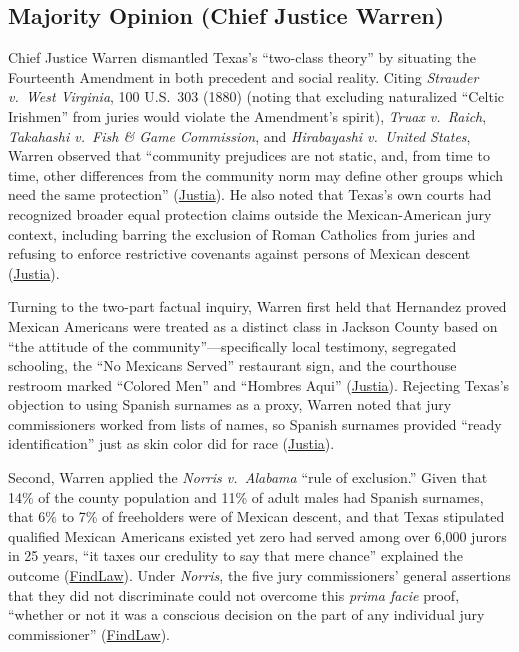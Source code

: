 \documentclass[12pt]{article}
\begin{document}
\subsection{Majority Opinion (Chief Justice Warren)}
Chief Justice Warren dismantled Texas's ``two-class theory'' by situating the Fourteenth Amendment in both precedent and social reality. Citing \textit{Strauder v.\ West Virginia}, 100 U.S.\ 303 (1880) (noting that excluding naturalized ``Celtic Irishmen'' from juries would violate the Amendment's spirit), \textit{Truax v.\ Raich}, \textit{Takahashi v.\ Fish \& Game Commission}, and \textit{Hirabayashi v.\ United States}, Warren observed that ``community prejudices are not static, and, from time to time, other differences from the community norm may define other groups which need the same protection'' (\href{https://supreme.justia.com/cases/federal/us/347/475/}{Justia}). He also noted that Texas's own courts had recognized broader equal protection claims outside the Mexican-American jury context, including barring the exclusion of Roman Catholics from juries and refusing to enforce restrictive covenants against persons of Mexican descent (\href{https://supreme.justia.com/cases/federal/us/347/475/}{Justia}).

Turning to the two-part factual inquiry, Warren first held that Hernandez proved Mexican Americans were treated as a distinct class in Jackson County based on ``the attitude of the community''---specifically local testimony, segregated schooling, the ``No Mexicans Served'' restaurant sign, and the courthouse restroom marked ``Colored Men'' and ``Hombres Aqui'' (\href{https://supreme.justia.com/cases/federal/us/347/475/}{Justia}). Rejecting Texas's objection to using Spanish surnames as a proxy, Warren noted that jury commissioners worked from lists of names, so Spanish surnames provided ``ready identification'' just as skin color did for race (\href{https://supreme.justia.com/cases/federal/us/347/475/}{Justia}).

Second, Warren applied the \textit{Norris v.\ Alabama} ``rule of exclusion.'' Given that 14\% of the county population and 11\% of adult males had Spanish surnames, that 6\% to 7\% of freeholders were of Mexican descent, and that Texas stipulated qualified Mexican Americans existed yet zero had served among over 6,000 jurors in 25 years, ``it taxes our credulity to say that mere chance'' explained the outcome (\href{https://caselaw.findlaw.com/court/us-supreme-court/347/475.html}{FindLaw}). Under \textit{Norris}, the five jury commissioners' general assertions that they did not discriminate could not overcome this \textit{prima facie} proof, ``whether or not it was a conscious decision on the part of any individual jury commissioner'' (\href{https://caselaw.findlaw.com/court/us-supreme-court/347/475.html}{FindLaw}).
\end{document}
